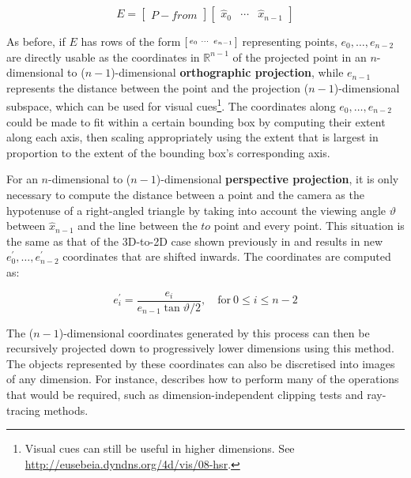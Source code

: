 \begin{equation*}
E = \begin{bmatrix} P - from \end{bmatrix}
\begin{bmatrix} \hat{x}_0 & \cdots & \hat{x}_{n-1} \end{bmatrix}
\end{equation*}

As before, if $E$ has rows of the form $\begin{bsmallmatrix} e_0 & \cdots & e_{n-1} \end{bsmallmatrix}$ representing points, $e_0, \ldots, e_{n-2}$ are directly usable as the coordinates in $\mathbb{R}^{n-1}$ of the projected point in an $n$-dimensional to ($n-1$)-dimensional \textbf{orthographic projection}, while $e_{n-1}$ represents the distance between the point and the projection ($n-1$)-dimensional subspace, which can be used for visual cues\footnote{Visual cues can still be useful in higher dimensions. See \url{http://eusebeia.dyndns.org/4d/vis/08-hsr}.}.
The coordinates along $e_0, \ldots, e_{n-2}$ could be made to fit within a certain bounding box by computing their extent along each axis, then scaling appropriately using the extent that is largest in proportion to the extent of the bounding box's corresponding axis.

For an $n$-dimensional to ($n-1$)-dimensional \textbf{perspective projection}, it is only necessary to compute the distance between a point and the camera as the hypotenuse of a right-angled triangle by taking into account the viewing angle $\vartheta$ between $\hat{x}_{n-1}$ and the line between the $to$ point and every point.
This situation is the same as that of the 3D-to-2D case shown previously in  and results in new $e_0^\prime, \ldots, e_{n-2}^\prime$ coordinates that are shifted inwards.
The coordinates are computed as:

\begin{equation*}
e_i^\prime = \frac{e_i}{e_{n-1} \tan{\vartheta / 2}}, \mathrm{\quad{}for\ } 0 \leq i \leq n-2 
\end{equation*}

The ($n-1$)-dimensional coordinates generated by this process can then be recursively projected down to progressively lower dimensions using this method.
The objects represented by these coordinates can also be discretised into images of any dimension.
For instance, \citet{Hanson94} describes how to perform many of the operations that would be required, such as dimension-independent clipping tests and ray-tracing methods.

